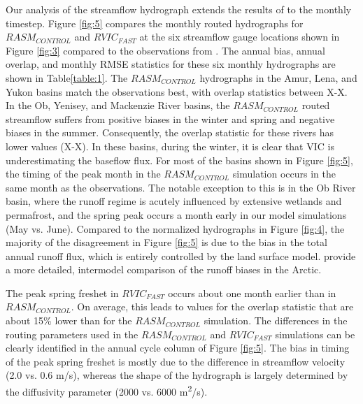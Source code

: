 \documentclass[jgrga, draft]{agutex}
\begin{document}
\begin{article}
Our analysis of the streamflow hydrograph extends the results of \citet{Hamman_2016} to the monthly timestep.
Figure \ref{fig:5} compares the monthly routed hydrographs for $RASM_{CONTROL}$ and $RVIC_{FAST}$ at the six streamflow gauge locations shown in Figure \ref{fig:3} compared to the observations from \citep{Dai_2009}.
The annual bias, annual overlap, and monthly RMSE statistics for these six monthly hydrographs are shown in Table\ref{table:1}.
The $RASM_{CONTROL}$ hydrographs in the Amur, Lena, and Yukon basins match the observations best, with overlap statistics between X-X.
In the Ob, Yenisey, and Mackenzie River basins, the $RASM_{CONTROL}$ routed streamflow suffers from positive biases in the winter and spring and negative biases in the summer.
Consequently, the overlap statistic for these rivers has lower values (X-X).
In these basins, during the winter, it is clear that VIC is underestimating the baseflow flux.
For most of the basins shown in Figure \ref{fig:5}, the timing of the peak month in the $RASM_{CONTROL}$ simulation occurs in the same month as the observations.
The notable exception to this is in the Ob River basin, where the runoff regime is acutely influenced by extensive wetlands and permafrost, and the spring peak occurs a month early in our model simulations (May vs. June).
Compared to the normalized hydrographs in Figure \ref{fig:4}, the majority of the disagreement in Figure \ref{fig:5} is due to the bias in the total annual runoff flux, which is entirely controlled by the land surface model.
\citet{Hamman_2016} provide a more detailed, intermodel comparison of the runoff biases in the Arctic.

The peak spring freshet in $RVIC_{FAST}$ occurs about one month earlier than in $RASM_{CONTROL}$.
On average, this leads to values for the overlap statistic  that are about 15\% lower than for the $RASM_{CONTROL}$ simulation.
The differences in the routing parameters used in the $RASM_{CONTROL}$ and $RVIC_{FAST}$ simulations can be clearly identified in the annual cycle column of Figure \ref{fig:5}.
The bias in timing of the peak spring freshet is mostly due to the difference in streamflow velocity (2.0 vs. 0.6 m/s), whereas the shape of the hydrograph is largely determined by the diffusivity parameter (2000 vs. 6000 m\textsuperscript{2}/s).


\end{article}
\end{document}
